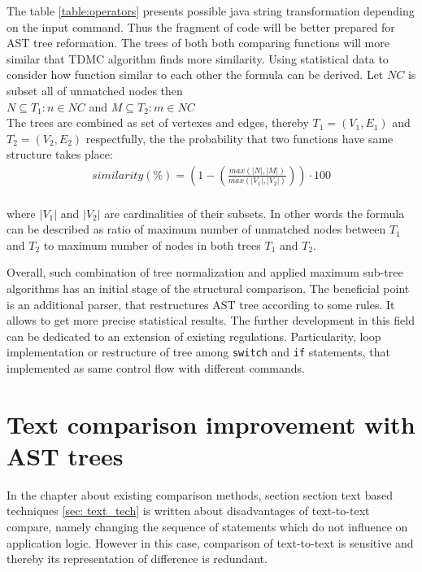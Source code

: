 \documentclass{report}
\begin{document}
The table \ref{table:operators} presents possible java string transformation depending on the input command. Thus the fragment of code will be better prepared for AST tree reformation. The trees of both both comparing functions will more similar that TDMC algorithm finds more similarity. Using statistical data to consider how function similar to each other the formula can be derived. Let $NC$ is subset all of unmatched nodes then\\
$ N \subseteq T_{1}: n \in NC $ and $ M \subseteq T_{2}: m \in NC $ \\
The trees are combined as set of vertexes and edges, thereby $T_{1} = (V_{1}, E_{1})$ and $T_{2} = (V_{2}, E_{2})$ respectfully, the the probability that two functions have same structure takes place: \\
\begin{gather*}
similarity(\%) =  \left ( 1 - \left (\frac{max(|N|, |M|)}{max(|V_{1}|, |V_{2}|)} \right ) \right )\cdot 100 
\end{gather*} \\
where $|V_{1}|$ and $|V_{2}|$ are cardinalities of their subsets. In other words the formula can be described as ratio of maximum number of unmatched nodes between $T_{1}$ and $T_{2}$ to maximum number of nodes in both trees $T_{1}$ and $T_{2}$. 

Overall, such combination of tree normalization and applied maximum sub-tree algorithms has an initial stage of the structural comparison. The beneficial point is an additional parser, that restructures AST tree according to some rules. It allows to get more precise statistical results. The further development in this field can be dedicated to an extension of existing regulations. Particularity, loop implementation or restructure of tree among \texttt{switch} and \texttt{if} statements, that implemented as same control flow with different commands. 


\chapter{Text comparison improvement with AST trees}
\label{cha:text-improvement}

In the chapter about existing comparison methods, section section text based techniques \ref{sec: text_tech} is written about disadvantages of text-to-text compare, namely changing the sequence of statements which do not influence on application logic. However in this case, comparison of text-to-text is sensitive  and thereby its representation of difference is redundant.
\end{document}
